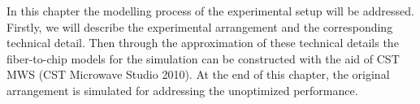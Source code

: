 
In this chapter the modelling process of the experimental setup will be addressed. Firstly, we will describe the experimental arrangement and the corresponding technical detail. Then through the approximation of these technical details the fiber-to-chip models for the simulation can be constructed with the aid of CST MWS (CST Microwave Studio 2010). At the end of this chapter, the original arrangement is simulated for addressing the unoptimized performance.